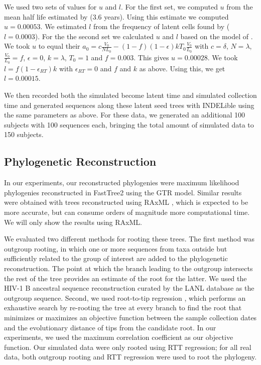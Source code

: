 \documentclass[12pt]{article}
\begin{document}
We used two sets of values for $u$ and $l$.
For the first set, we computed $u$ from the mean half life estimated by \cite{Crooks15} ($3.6$ years).
Using this estimate we computed $u = 0.00053$.
We estimated $l$ from the frequency of latent cells found by \cite{Ho13} ($l=0.0003$).
For the the second set we calculated $u$ and $l$ based on the model of \cite{Kim06}.
We took $u$ to equal their $a_0 = c\frac{V_0}{NL_0}-(1-f)(1-\epsilon)kT_0\frac{V_0}{L_0}$ with $c = \delta$, $N = \lambda$,  $\frac{V_0}{L_0} = f$, $\epsilon = 0$, $k = \lambda$, $T_0 = 1$ and $f = 0.003$.
This gives $u = 0.00028$.
We took $l = f(1-\epsilon_{RT})k$ with $\epsilon_{RT} = 0$ and $f$ and $k$ as above.
Using this, we get $l = 0.00015$.

We then recorded both the simulated become latent time and simulated collection time and generated sequences along these latent seed trees with INDELible using the same parameters as above. 
For these data, we generated an additional 100 subjects with 100 sequences each, bringing the total amount of simulated data to 150 subjects.

\subsection * {Phylogenetic Reconstruction} \label{subsec:phylo}
In our experiments, our reconstructed phylogenies were maximum likelihood phylogenies reconstructed in FastTree2 \citep{FastTree10} using the GTR model.
Similar results were obtained with trees reconstructed using RAxML \citep{Raxml14}, which is expected to be more accurate, but can consume orders of magnitude more computational time.
We will only show the results using RAxML.

We evaluated two different methods for rooting these trees. 
The first method was outgroup rooting, in which one or more sequences from taxa outside but sufficiently related to the group of interest are added to the phylogenetic reconstruction.
The point at which the branch leading to the outgroup intersects the rest of the tree provides an estimate of the root for the latter.
We used the HIV-1 B ancestral sequence reconstruction curated by the LANL database \citep{LosAlamos} as the outgroup sequence.
Second, we used root-to-tip regression \citep[RTT;][]{Korber00}, which performs an exhaustive search by re-rooting the tree at every branch to find the root that minimizes or maximizes an objective function between the sample collection dates and the evolutionary distance of tips from the candidate root.
In our experiments, we used the maximum correlation coefficient as our objective function.
Our simulated data were only rooted using RTT regression; for all real data, both outgroup rooting and RTT regression were used to root the phylogeny.
\end{document}
